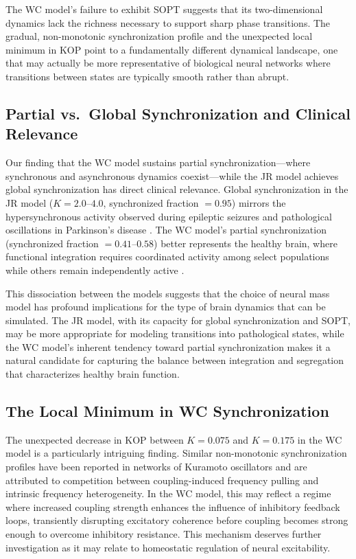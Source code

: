 \documentclass[11pt]{article}
\begin{document}
The WC model's failure to exhibit SOPT suggests that its two-dimensional dynamics lack the richness necessary to support sharp phase transitions. The gradual, non-monotonic synchronization profile and the unexpected local minimum in KOP point to a fundamentally different dynamical landscape, one that may actually be more representative of biological neural networks where transitions between states are typically smooth rather than abrupt.

\subsection{Partial vs.\ Global Synchronization and Clinical Relevance}

Our finding that the WC model sustains partial synchronization---where synchronous and asynchronous dynamics coexist---while the JR model achieves global synchronization has direct clinical relevance. Global synchronization in the JR model ($K = 2.0$--$4.0$, synchronized fraction $= 0.95$) mirrors the hypersynchronous activity observed during epileptic seizures \citep{jiruska2013synchronization} and pathological oscillations in Parkinson's disease \citep{hammond2007pathological}. The WC model's partial synchronization (synchronized fraction $= 0.41$--$0.58$) better represents the healthy brain, where functional integration requires coordinated activity among select populations while others remain independently active \citep{cabral2014exploring}.

This dissociation between the models suggests that the choice of neural mass model has profound implications for the type of brain dynamics that can be simulated. The JR model, with its capacity for global synchronization and SOPT, may be more appropriate for modeling transitions into pathological states, while the WC model's inherent tendency toward partial synchronization makes it a natural candidate for capturing the balance between integration and segregation that characterizes healthy brain function.

\subsection{The Local Minimum in WC Synchronization}

The unexpected decrease in KOP between $K = 0.075$ and $K = 0.175$ in the WC model is a particularly intriguing finding. Similar non-monotonic synchronization profiles have been reported in networks of Kuramoto oscillators \citep{acebrón2005kuramoto} and are attributed to competition between coupling-induced frequency pulling and intrinsic frequency heterogeneity. In the WC model, this may reflect a regime where increased coupling strength enhances the influence of inhibitory feedback loops, transiently disrupting excitatory coherence before coupling becomes strong enough to overcome inhibitory resistance. This mechanism deserves further investigation as it may relate to homeostatic regulation of neural excitability.
\end{document}
